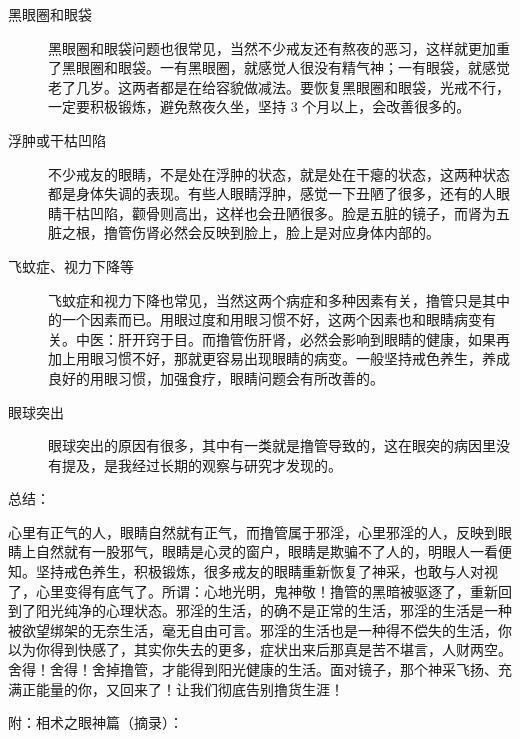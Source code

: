 \begin{description}
    \item[黑眼圈和眼袋] 黑眼圈和眼袋问题也很常见，当然不少戒友还有熬夜的恶习，这样就更加重了黑眼圈和眼袋。一有黑眼圈，就感觉人很没有精气神；一有眼袋，就感觉老了几岁。这两者都是在给容貌做减法。要恢复黑眼圈和眼袋，光戒不行，一定要积极锻炼，避免熬夜久坐，坚持 3 个月以上，会改善很多的。
    \item[浮肿或干枯凹陷] 不少戒友的眼睛，不是处在浮肿的状态，就是处在干瘪的状态，这两种状态都是身体失调的表现。有些人眼睛浮肿，感觉一下丑陋了很多，还有的人眼睛干枯凹陷，颧骨则高出，这样也会丑陋很多。脸是五脏的镜子，而肾为五脏之根，撸管伤肾必然会反映到脸上，脸上是对应身体内部的。
    \item[飞蚊症、视力下降等] 飞蚊症和视力下降也常见，当然这两个病症和多种因素有关，撸管只是其中的一个因素而已。用眼过度和用眼习惯不好，这两个因素也和眼睛病变有关。中医：肝开窍于目。而撸管伤肝肾，必然会影响到眼睛的健康，如果再加上用眼习惯不好，那就更容易出现眼睛的病变。一般坚持戒色养生，养成良好的用眼习惯，加强食疗，眼睛问题会有所改善的。
    \item[眼球突出] 眼球突出的原因有很多，其中有一类就是撸管导致的，这在眼突的病因里没有提及，是我经过长期的观察与研究才发现的。
\end{description}

总结：

心里有正气的人，眼睛自然就有正气，而撸管属于邪淫，心里邪淫的人，反映到眼睛上自然就有一股邪气，眼睛是心灵的窗户，眼睛是欺骗不了人的，明眼人一看便知。坚持戒色养生，积极锻炼，很多戒友的眼睛重新恢复了神采，也敢与人对视了，心里变得有底气了。所谓：心地光明，鬼神敬！撸管的黑暗被驱逐了，重新回到了阳光纯净的心理状态。邪淫的生活，的确不是正常的生活，邪淫的生活是一种被欲望绑架的无奈生活，毫无自由可言。邪淫的生活也是一种得不偿失的生活，你以为你得到快感了，其实你失去的更多，症状出来后那真是苦不堪言，人财两空。舍得！舍得！舍掉撸管，才能得到阳光健康的生活。面对镜子，那个神采飞扬、充满正能量的你，又回来了！让我们彻底告别撸货生涯！

附：相术之眼神篇（摘录）：

